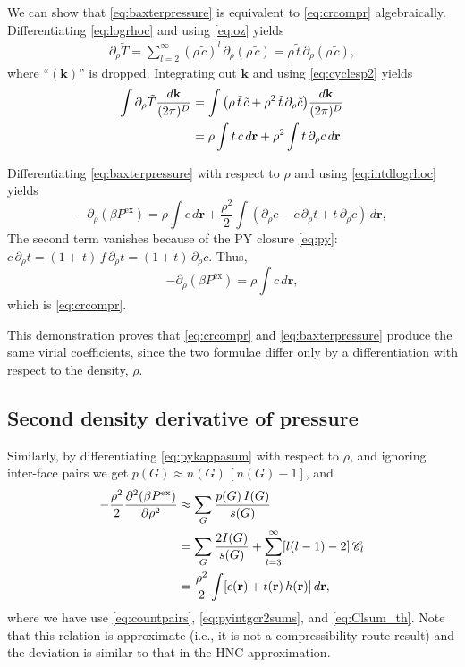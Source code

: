 \documentclass[preprint]{revtex4-1}
\newcommand{\vct}[1]{\mathbf{#1}}
\providecommand{\vr}{} %
\renewcommand{\vr}{\vct{r}}
\newcommand{\vk}{\vct{k}}
\newcommand{\dvk}{\frac{d\vk}{(2\pi)^D}}
\newcommand{\supex}[1]{ { { #1 }^{ \mathrm{ex} } } }
\newcommand{\Pex}{\supex{P}}
\newcommand{\Chn}{\mathscr{C}}
\begin{document}
We can show that
  \eqref{eq:baxterpressure} is equivalent to \eqref{eq:crcompr}
  algebraically\cite{baxterpressure}.
%
Differentiating \eqref{eq:logrhoc} and using \eqref{eq:oz} yields
%
\begin{align*}
  \partial_\rho \tilde T
=
  \sum_{l = 2}^{\infty}
    ( \rho \, \tilde{c} )^l
    \, \partial_\rho ( \rho \, \tilde{c} )
=
  \rho \, \tilde{t}
  \, \partial_\rho ( \rho \, \tilde{c} ),
\end{align*}
%
where ``$(\vk)$'' is dropped.
%
Integrating out $\vk$ and using \eqref{eq:cyclesp2} yields
%
\begin{align}
  \int \partial_\rho \tilde T \dvk
&=
  \int
    \big(
      \rho \, \tilde{t} \, \tilde{c}
      +
      \rho^2 \, \tilde{t} \, \partial_\rho \tilde{c}
    \big) \dvk
\notag \\
&=
  \rho \int t \, c \, d\vr
      +
  \rho^2 \int t \, \partial_\rho c \, d\vr.
\label{eq:intdlogrhoc}
\end{align}



Differentiating \eqref{eq:baxterpressure}
with respect to $\rho$ and using \eqref{eq:intdlogrhoc} yields
%
\[
  -\partial_\rho ( \beta \Pex )
=
  \rho \int c \, d\vr
  + \frac{\rho^2}{2} \int (
    \partial_\rho c - c \, \partial_\rho t + t \, \partial_\rho c
    ) \, d\vr,
\]
The second term vanishes because of the PY closure \eqref{eq:py}:
$c \, \partial_\rho t = (1 + \, t) \, f \, \partial_\rho t = (1 + t) \, \partial_\rho c$.
%
Thus,
\[
  -\partial_\rho ( \beta \Pex )
=
  \rho \int c \, d\vr,
\]
which is \eqref{eq:crcompr}.

This demonstration proves that
\eqref{eq:crcompr} and \eqref{eq:baxterpressure}
produce the same virial coefficients,
since the two formulae differ only
by a differentiation with respect to the density, $\rho$.




\subsection{Second density derivative of pressure}

Similarly,
  by differentiating \eqref{eq:pykappasum} with respect to $\rho$,
  and ignoring inter-face pairs
  we get
  $p(G) \approx n(G) \, [n(G) - 1]$,
  and
%
\begin{align}
           -\frac{\rho^2}{2}
            \frac{\partial^2 ( \beta \Pex ) }
                 {\partial \rho^2}
  &\approx   \sum_G \frac{ p(G) \, I(G) }{ s(G) }
    \notag \\
  &=
            \sum_G \frac{2 I(G) }{s(G)}
            + \sum_{l = 3}^\infty [l(l-1) - 2] \, \Chn_l
    \notag \\
  &=         \frac{\rho^2}{2} \int [c(\vr) + t(\vr) \, h(\vr) ] \, d\vr,
\label{eq:pyddpressure}
\end{align}
%
where we have use \eqref{eq:countpairs}, \eqref{eq:pyintgcr2sums}, and \eqref{eq:Clsum_th}.
%
Note that this relation is approximate (i.e., it is not a compressibility route result)
  and the deviation is
  similar to that in the HNC approximation.
\end{document}
